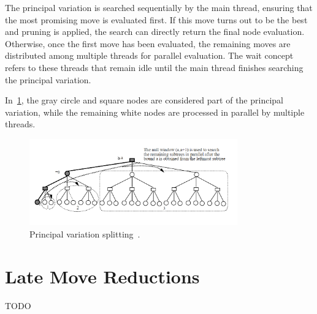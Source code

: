 \vspace{1em}

\noindent The principal variation is searched sequentially by the main thread, ensuring that the most promising move is evaluated first. If this move turns out to be the best and pruning is applied, the search can directly return the final node evaluation. Otherwise, once the first move has been evaluated, the remaining moves are distributed among multiple threads for parallel evaluation. The wait concept refers to these threads that remain idle until the main thread finishes searching the principal variation.

\vspace{1em}

\noindent In~\cref{fig:pvsplitting}, the gray circle and square nodes are considered part of the principal variation, while the remaining white nodes are processed in parallel by multiple threads.

\begin{figure}
   \centering
   \includegraphics[width=0.8\textwidth]{Imagenes/Bitmap/pvsplitting.png}
   \caption{Principal variation splitting~\cite{PVSplitting}.}\label{fig:pvsplitting}
\end{figure}

\section{Late Move Reductions}
TODO

